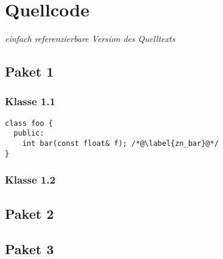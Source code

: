 \chapter{Quellcode}
\label{ch:6}

{\em einfach referenzierbare Version des Quelltexts} 

\section{Paket 1}
\label{sec:6.1}

\subsection{Klasse 1.1}
\label{ssec:6.1.1}

\begin{lstlisting}[caption=Dokumentierter Quellcode in {\tt klasse1.1.hpp},label=klasse1.1.hpp]
class foo {
  public:
    int bar(const float& f); /*@\label{zn_bar}@*/
}
\end{lstlisting}

\subsection{Klasse 1.2}

\section{Paket 2}

\section{Paket 3}
